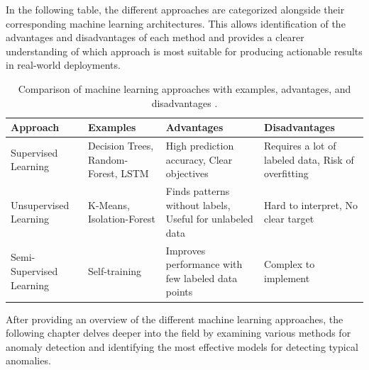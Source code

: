 In the following table, the different approaches are categorized alongside their corresponding machine learning architectures. This allows identification of the advantages and disadvantages of each method and provides a clearer understanding of which approach is most suitable for producing actionable results in real-world deployments.
\begin{table}[H]
	\centering
	\begin{tabular}{|l|p{3.5cm}|p{4cm}|p{4cm}|}
		\hline
		\textbf{Approach} & \textbf{Examples} & \textbf{Advantages} & \textbf{Disadvantages}\\
		\hline
		Supervised Learning & Decision Trees, \newline Random-Forest, \newline LSTM & High prediction accuracy, \newline Clear objectives & Requires a lot of labeled data, \newline Risk of overfitting\\
		\hline
		Unsupervised Learning & K-Means, \newline Isolation-Forest & Finds patterns without labels, \newline Useful for unlabeled data & Hard to interpret, \newline No clear target\\
		\hline
		Semi-Supervised Learning & Self-training & Improves performance with few labeled data points & Complex to implement\\
		\hline
	\end{tabular}
	\caption{Comparison of machine learning approaches with examples, advantages, and disadvantages \cite{AI-Definition}.}
    \label{tab:AI_approaches}
\end{table}

After providing an overview of the different machine learning approaches, the following chapter delves deeper into the field by examining various methods for anomaly detection and identifying the most effective models for detecting typical anomalies.
